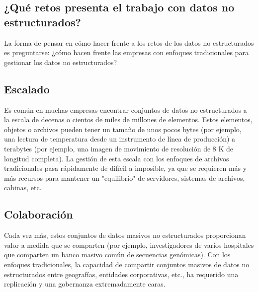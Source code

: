 \documentclass[twoside,twocolumn]{article}
\begin{document}
\subsection{¿Qué retos presenta el trabajo con datos no estructurados?}
La forma de pensar en cómo hacer frente a los retos de los datos no estructurados es preguntarse: ¿cómo hacen frente las empresas con enfoques tradicionales para gestionar los datos no estructurados? 
 
\subsection{Escalado}
Es común en muchas empresas encontrar conjuntos de datos no estructurados a la escala de decenas o cientos de miles de millones de elementos. Estos elementos, objetos o archivos pueden tener un tamaño de unos pocos bytes (por ejemplo, una lectura de temperatura desde un instrumento de línea de producción) a terabytes (por ejemplo, una imagen de movimiento de resolución de 8 K de longitud completa). La gestión de esta escala con los enfoques de archivos tradicionales pasa rápidamente de difícil a imposible, ya que se requieren más y más recursos para mantener un "equilibrio" de servidores, sistemas de archivos, cabinas, etc.


\subsection{Colaboración}
Cada vez más, estos conjuntos de datos masivos no estructurados proporcionan valor a medida que se comparten (por ejemplo, investigadores de varios hospitales que comparten un banco masivo común de secuencias genómicas). Con los enfoques tradicionales, la capacidad de compartir conjuntos masivos de datos no estructurados entre geografías, entidades corporativas, etc., ha requerido una replicación y una gobernanza extremadamente caras.
\end{document}
